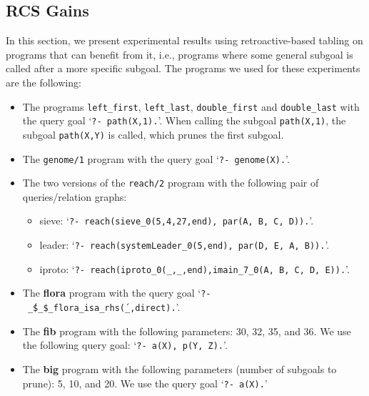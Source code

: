 


\subsection{RCS Gains}

In this section, we present experimental results using retroactive-based tabling on programs that
can benefit from it, i.e., programs where some general subgoal is called after a more specific subgoal.
The programs we used for these experiments are the following:

\begin{itemize}
   \item The programs \texttt{left\_first}, \texttt{left\_last},
   \texttt{double\_first} and \texttt{double\_last} with the query goal `\texttt{?-~path(X,1).}'.
   When calling the subgoal \texttt{path(X,1)}, the subgoal
   \texttt{path(X,Y)} is called, which prunes the first subgoal.
   
   \item The \texttt{genome/1} program with the query goal `\texttt{?-~genome(X).}'.
   
   \item The two versions of the \texttt{reach/2} program with the following pair of queries/relation graphs:

   \begin{itemize}
      \item sieve: `\texttt{?-~reach(sieve\_0(5,4,27,end),~par(A,~B,~C,~D)).}'.
      \item leader: `\texttt{?-~reach(systemLeader\_0(5,end),~par(D,~E,~A,~B)).}'.
      \item iproto: `\texttt{?-~reach(iproto\_0(\_,\_,end),imain\_7\_0(A,~B,~C,~D,~E)).}'.
   \end{itemize}
   
   \item The \textbf{flora} program with the query goal `\texttt{?-~\'\_\$\_\$\_flora\_isa\_rhs\'(\_,direct).}'.
   
   \item The \textbf{fib} program with the following parameters: 30, 32, 35, and 36. We use the following
   query goal: `\texttt{?-~a(X),~p(Y,~Z).}'.
   
   \item The \textbf{big} program with the following parameters (number of subgoals to prune): 5, 10, and 20.
   We use the query goal `\texttt{?-~a(X).}'
\end{itemize}

